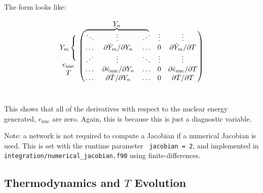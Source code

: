 The form looks like:
\renewcommand{\arraystretch}{1.5}
\renewcommand{\arraycolsep}{10pt}  %
\[ \vphantom{%
    \begin{matrix}
    \overbrace{XYZ}^{\mbox{$R$}}\\ \\ \\ \\ \\ \\
    \underbrace{pqr}_{\mbox{$S$}}
    \end{matrix}}%
\begin{matrix}%
    \coolleftbrace{Y_m}{~ \\ ~ \\ ~}\\ \enuc \\ T \\
\end{matrix}%
\begin{pmatrix}
\coolover{Y_n}{\ddots & \hphantom{\partial \dot{Y}_m}\vdots\hphantom{/\partial Y_n} & \iddots } & \vdots & \vdots \\
    \hdots & \partial \dot{Y}_m/\partial Y_n & \hdots & 0 & \partial \dot{Y}_m/\partial T    \\
    \iddots & \hphantom{\partial \dot{Y}_m}\vdots\hphantom{/\partial Y_n} & \ddots & \vdots & \vdots  \\
    \hdots & \partial \edot/\partial Y_n & \hdots & 0 & \partial \edot/\partial T   \\
    \hdots & \partial \dot{T}/\partial Y_n & \hdots & 0 & \partial \dot{T}/\partial T   \\
\end{pmatrix}%
\]
\renewcommand{\arraystretch}{1.0}
\renewcommand{\arraycolsep}{6pt}

This shows that all of the derivatives with respect to the nuclear
energy generated, $e_\mathrm{nuc}$ are zero.  Again, this is because
this is just a diagnostic variable.

Note: a network is not required to compute a Jacobian if a numerical
Jacobian is used.  This is set with the runtime parameter {\tt
  jacobian = 2}, and implemented in {\tt
  integration/numerical\_jacobian.f90} using finite-differences.




\subsection{Thermodynamics and $T$ Evolution}


